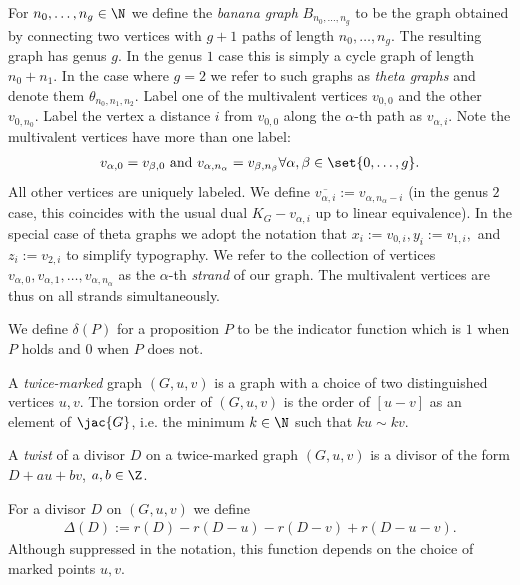 \begin{defi}\label{def-BanGraph}
    For $n_0,\dots,n_g \in \N$ we define the \textit{banana graph} $B_{n_0,\dots,n_g}$ to be the graph obtained by connecting two vertices with $g+1$ paths of length $n_0,\dots,n_g$. The resulting graph has genus $g$. In the genus $1$ case this is simply a cycle graph of length $n_0+n_1$. In the case where $g = 2$ we refer to such graphs as \textit{theta graphs} and denote them $\theta_{n_0,n_1,n_2}$. Label one of the multivalent vertices $v_{0,0}$ and the other $v_{0,n_0}$. Label the vertex a distance $i$ from $v_{0,0}$ along the $\alpha$-th path as $v_{\alpha,i}$. Note the multivalent vertices have more than one label:
    \begin{align*}
        v_{\alpha,0} = v_{\beta,0} \text{ and } v_{\alpha,n_\alpha} = v_{\beta,n_\beta} \forall \alpha,\beta \in \set{0,\dots,g}.
    \end{align*}
    All other vertices are uniquely labeled. We define $\overline{v_{\alpha,i}}:= v_{\alpha,n_\alpha-i}$ (in the genus $2$ case, this coincides with the usual dual $K_G-v_{\alpha,i}$ up to linear equivalence). In the special case of theta graphs we adopt the notation that $x_i:= v_{0,i}, y_i := v_{1,i},$ and $z_i:= v_{2,i}$ to simplify typography. We refer to the collection of vertices $v_{\alpha,0},v_{\alpha,1},\dots,v_{\alpha,n_\alpha}$ as the $\alpha$-th \textit{strand} of  our graph. The multivalent vertices are thus on all strands simultaneously.
\end{defi}

\begin{defi}\label{def-delt}
We define $\delta(P)$ for a proposition $P$ to be the indicator function which is $1$ when $P$ holds and $0$ when $P$ does not.
\end{defi}

\begin{defi}\label{def-TwMkGraph}
A \textit{twice-marked} graph $(G,u,v)$ is a graph with a choice of two distinguished vertices $u,v$. The torsion order of $(G,u,v)$ is the order of $[u-v]$ as an element of $\jac{G}$, i.e. the minimum $k \in \N$ such that $ku \sim kv$.
\end{defi}

\begin{defi}\label{def-Twist}
A \textit{twist} of a divisor $D$ on a twice-marked graph $(G,u,v)$ is a divisor of the form $D+au+bv$, $a,b \in \Z$.
\end{defi}

\begin{defi}\label{def-Delt}
For a divisor $D$ on $(G,u,v)$ we define
\begin{align*}
    \Delta(D):=r(D) - r(D-u) - r(D-v) + r(D-u-v).
\end{align*}
Although suppressed in the notation, this function depends on the choice of marked points $u,v$.
\end{defi}

